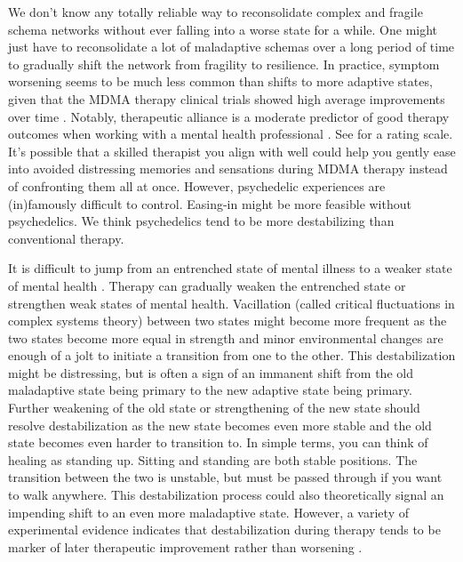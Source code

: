 \documentclass[12pt,letterpaper]{book}
\begin{document}
We don't know any totally reliable way to reconsolidate complex and fragile schema networks without ever falling into a worse state for a while. One might just have to reconsolidate a lot of maladaptive schemas over a long period of time to gradually shift the network from fragility to resilience. In practice, symptom worsening seems to be much less common than shifts to more adaptive states, given that the MDMA therapy clinical trials showed high average improvements over time \cite{mitchellMDMAClinicalTrial,mitchellMDMAClinicalTrial2}. Notably, therapeutic alliance is a moderate predictor of good therapy outcomes when working with a mental health professional \cite{fluckiger2018alliance}. See \textcite{BRWAIdownload} for a rating scale. It's possible that a skilled therapist you align with well could help you gently ease into avoided distressing memories and sensations during MDMA therapy instead of confronting them all at once. However, psychedelic experiences are (in)famously difficult to control. Easing-in might be more feasible without psychedelics. We think psychedelics tend to be more destabilizing than conventional therapy.

It is difficult to jump from an entrenched state of mental illness to a weaker state of mental health \cite{hayes2020complex}. Therapy can gradually weaken the entrenched state or strengthen weak states of mental health. Vacillation (called critical fluctuations in complex systems theory) between two states might become more frequent as the two states become more equal in strength and minor environmental changes are enough of a jolt to initiate a transition from one to the other. This destabilization might be distressing, but is often a sign of an immanent shift from the old maladaptive state being primary to the new adaptive state being primary. Further weakening of the old state or strengthening of the new state should resolve destabilization as the new state becomes even more stable and the old state becomes even harder to transition to. In simple terms, you can think of healing as standing up. Sitting and standing are both stable positions. The transition between the two is unstable, but must be passed through if you want to walk anywhere. This destabilization process could also theoretically signal an impending shift to an even more maladaptive state. However, a variety of experimental evidence indicates that destabilization during therapy tends to be marker of later therapeutic improvement rather than worsening \cite{hayes2020complex,olthofDestabilization}.
\end{document}
